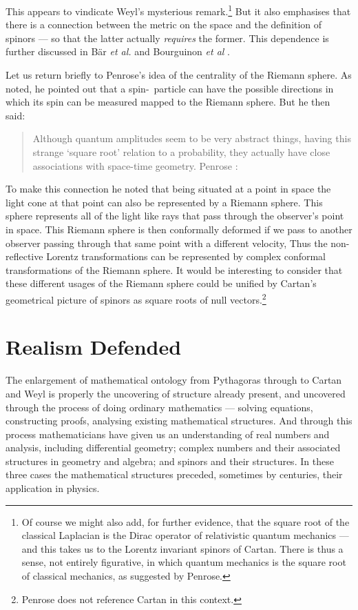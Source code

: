 \documentclass[11pt,oneside,a4paper]{article}
\begin{document}
This appears to vindicate Weyl's mysterious remark.\footnote{Of course we might also add, for further evidence, that the square root of the classical Laplacian is the Dirac operator of relativistic quantum mechanics --- and this takes us to the Lorentz invariant spinors of Cartan. There is thus a sense, not entirely figurative, in which quantum mechanics is the square root of classical mechanics, as suggested by Penrose.} But it also emphasises that there is a connection between the metric on the space and the definition of spinors --- so that the latter actually \textit{requires} the former. This dependence is further discussed in Bär \textit{et al.} \parencite*{bar_generalized_2005} and Bourguinon \textit{et al} \parencite*{bourguignon_spinorial_2015}.

Let us return briefly to Penrose's idea of the centrality of the Riemann sphere. As noted, he pointed out that a spin-\textonehalf\ particle can have the possible directions in which its spin can be measured mapped to the Riemann sphere. But he then said:
\begin{quotation}
Although quantum amplitudes seem to be very abstract things, having this strange `square root' relation to a probability, they actually have close associations with space-time geometry. Penrose \parencite[230]{arnold_mathematical_2000}:
\end{quotation}
To make this connection he noted that being situated at a point in space the light cone at that point can also be represented by a Riemann sphere. This sphere represents all of the light like rays that pass through the observer's point in space. This Riemann sphere is then conformally deformed if we pass to another observer passing through that same point with a different velocity, Thus the non-reflective Lorentz transformations can be represented by complex conformal transformations of the Riemann sphere. It would be interesting to consider that these different usages of the Riemann sphere could be unified by Cartan's geometrical picture of spinors as square roots of null vectors.\footnote{Penrose \parencite*{penrose_road_2004} does not reference Cartan in this context.}


\section{Realism Defended}


The enlargement of mathematical ontology from Pythagoras through to Cartan and Weyl is properly the uncovering of structure already present, and uncovered through the process of doing ordinary mathematics --- solving equations, constructing proofs, analysing existing mathematical structures. And through this process mathematicians have given us an understanding of real numbers and analysis, including differential geometry; complex numbers and their associated structures in geometry and algebra; and spinors and their structures. In these three cases the mathematical structures preceded, sometimes by centuries, their application in physics. 
\end{document}
